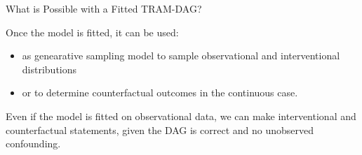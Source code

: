 \documentclass[onlytextwidth,english]{beamer}\usepackage[]{graphicx}\usepackage[]{xcolor}
\begin{document}
\begin{frame}{What is Possible with a Fitted TRAM-DAG?}

Once the model is fitted, it can be used:

\begin{itemize}
\item as genearative sampling model to sample observational and interventional distributions
\item or to determine counterfactual outcomes in the continuous case.
\end{itemize}


Even if the model is fitted on observational data, we can make interventional and counterfactual statements, given the DAG is correct and no unobserved confounding.


\end{frame}
\end{document}
